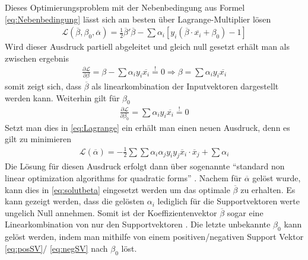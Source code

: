 \documentclass[
]{article}
\begin{document}
Dieses Optimierungsproblem mit der Nebenbedingung aus Formel
\ref{eq:Nebenbedingung} lässt sich am besten über Lagrange-Multiplier
lösen \begin{align}
\mathcal{L}(\overline\beta,\beta_0,\overline \alpha)=\frac{1}{2}\overline \beta ' \overline \beta-\sum \alpha_i[y_i(\overline \beta \cdot \overline{x_i}+\beta_0)-1]\label{eq:Lagrange}
\end{align} Wird dieser Ausdruck partiell abgeleitet und gleich null
gesetzt erhält man als zwischen ergebnis \begin{align}
\frac{\partial \mathcal{L}}{\partial \beta}=\beta-\sum \alpha_i y_i \overline{x_i}\overset{!}{=}0 \Rightarrow \beta=\sum \alpha_i y_i \overline{x_i}\label{eq:solutbeta}
\end{align} somit zeigt sich, dass \(\overline{\beta}\) als
linearkombination der Inputvektoren dargestellt werden kann. Weiterhin
gilt für \(\beta_0\) \begin{align}
\frac{\partial \mathcal{L}}{\partial \beta_0}=\sum \alpha_i y_i \overline{x_i}\overset{!}{=}0\label{eq:solutbeta0}
\end{align} Setzt man dies in \eqref{eq:Lagrange} ein erhält man einen
neuen Ausdruck, denn es gilt zu minimieren \begin{align}
\mathcal{L}(\overline \alpha)=-\frac{1}{2}\sum \sum \alpha_i \alpha_j y_i y_j \overline{x}_i \cdot \overline{x}_j+\sum \alpha_i\label{eq:dualproblem}
\end{align} Die Lösung für diesen Ausdruck erfolgt dann über sogenannte
\enquote{standard non linear optimization algorithms for quadratic forms}
\parencite{boserTrainingAlgorithmOptimal1992}. Nachem für
\(\overline \alpha\) gelöst wurde, kann dies in \eqref{eq:solutbeta}
eingesetzt werden um das optimale \(\overline{\beta}\) zu erhalten. Es
kann gezeigt werden, dass die gelösten \(\alpha_i\) lediglich für die
Supportvektoren werte ungelich Null annehmen. Somit ist der
Koeffizientenvektor \(\overline{\beta}\) sogar eine Linearkombination
von nur den Supportvektoren
\parencite{boserTrainingAlgorithmOptimal1992}. Die letzte unbekannte
\(\beta_0\) kann gelöst werden, indem man mithilfe von einem
positiven/negativen Support Vektor \eqref{eq:posSV}/ \eqref{eq:negSV}
nach \(\beta_0\) löst.
\end{document}
